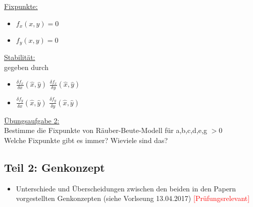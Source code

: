 \underline{Fixpunkte:}
\begin{itemize}
	\item $f_x(x,y)=0$
	\item $f_y(x,y)=0$
\end{itemize}

\underline{Stabilität:}\\
gegeben durch 
\begin{itemize}
	\item $\frac{\delta f_x}{\delta x}(\hat{x}, \hat{y})$ $\frac{\delta f_x}{\delta y}(\hat{x}, \hat{y})$
	\item $\frac{\delta f_y}{\delta x}(\hat{x}, \hat{y})$ $\frac{\delta f_y}{\delta y}(\hat{x}, \hat{y})$
\end{itemize}

\underline{Übungsaufgabe 2:}\\
Bestimme die Fixpunkte von Räuber-Beute-Modell für a,b,c,d,e,g $>$0\\
Welche Fixpunkte gibt es immer? Wieviele sind das?

\subsection{Teil 2: Genkonzept}

\begin{itemize}
	\item Unterschiede und Überscheidungen zwischen den beiden in den Papern vorgestellten Genkonzepten (siehe Vorlseung 13.04.2017) \textcolor{red}{[Prüfungsrelevant]}
\end{itemize}